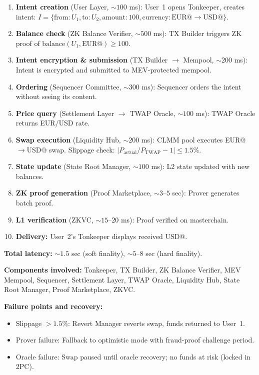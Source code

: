 \documentclass[12pt,a4paper]{article}
\theoremstyle{definition}
\theoremstyle{remark}
\DeclareMathOperator{\TWAP}{TWAP}
\begin{document}
\begin{enumerate}[nosep]
    \item \textbf{Intent creation} (User Layer, ${\sim}100$ ms): User~1 opens Tonkeeper, creates intent: $I = \{\text{from}: U_1, \text{to}: U_2, \text{amount}: 100, \text{currency}: \text{EUR@} \to \text{USD@}\}$.
    \item \textbf{Balance check} (ZK Balance Verifier, ${\sim}500$ ms): TX Builder triggers ZK proof of $\text{balance}(U_1, \text{EUR@}) \geq 100$.
    \item \textbf{Intent encryption \& submission} (TX Builder $\to$ Mempool, ${\sim}200$ ms): Intent is encrypted and submitted to MEV-protected mempool.
    \item \textbf{Ordering} (Sequencer Committee, ${\sim}300$ ms): Sequencer orders the intent without seeing its content.
    \item \textbf{Price query} (Settlement Layer $\to$ TWAP Oracle, ${\sim}100$ ms): TWAP Oracle returns EUR/USD rate.
    \item \textbf{Swap execution} (Liquidity Hub, ${\sim}200$ ms): CLMM pool executes EUR@$\to$USD@ swap. Slippage check: $|P_{\text{actual}}/P_{\TWAP} - 1| \leq 1.5\%$.
    \item \textbf{State update} (State Root Manager, ${\sim}100$ ms): L2 state updated with new balances.
    \item \textbf{ZK proof generation} (Proof Marketplace, ${\sim}3$--$5$ sec): Prover generates batch proof.
    \item \textbf{L1 verification} (ZKVC, ${\sim}15$--$20$ ms): Proof verified on masterchain.
    \item \textbf{Delivery:} User~2's Tonkeeper displays received USD@.
\end{enumerate}

\textbf{Total latency:} ${\sim}1.5$ sec (soft finality), ${\sim}5$--$8$ sec (hard finality).

\textbf{Components involved:} Tonkeeper, TX Builder, ZK Balance Verifier, MEV Mempool, Sequencer, Settlement Layer, TWAP Oracle, Liquidity Hub, State Root Manager, Proof Marketplace, ZKVC.

\textbf{Failure points and recovery:}
\begin{itemize}[nosep]
    \item Slippage $> 1.5\%$: Revert Manager reverts swap, funds returned to User~1.
    \item Prover failure: Fallback to optimistic mode with fraud-proof challenge period.
    \item Oracle failure: Swap paused until oracle recovery; no funds at risk (locked in 2PC).
\end{itemize}
\end{document}

